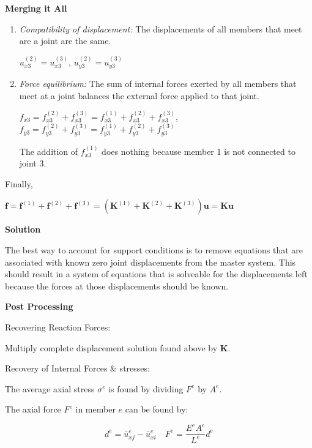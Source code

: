 \documentclass{article}
\begin{document}
\begin{multicols*}{2}
    \textbf{Merging it All}\par 
    \begin{enumerate}
        \item \textit{Compatibility of displacement:} The displacements of all 
                members that meet are a joint are the same.\par
                $u_{x3}^{(2)} = u_{x3}^{(3)}$, $u_{y3}^{(2)} = u_{y3}^{(3)}$
        \item \textit{Force equilibrium:} The sum of internal forces exerted by 
                all members that meet at a joint balances the external force 
                applied to that joint.\par 
                $f_{x3} = f_{x3}^{(2)}+f_{x3}^{(3)}=f_{x3}^{(1)}+f_{x3}^{(2)}+f_{x3}^{(3)}$, 
                $f_{y3} = f_{y3}^{(2)}+f_{y3}^{(3)}=f_{y3}^{(1)}+f_{y3}^{(2)}+f_{y3}^{(3)}$\par
                The addition of $f_{x3}^{(1)}$ does nothing because member 1 is
                not connected to joint 3.
    \end{enumerate}

    Finally, \par 
    $\textbf{f} = \textbf{f}^{(1)}+\textbf{f}^{(2)}+\textbf{f}^{(3)}=\left(\textbf{K}^{(1)}+\textbf{K}^{(2)}+\textbf{K}^{(3)}\right)\textbf{u} = \textbf{Ku}$

    \textbf{Solution}

    The best way to account for support conditions is to remove equations that
    are associated with known zero joint displacements from the master system.
    This should result in a system of equations that is solveable for the displacements
    left because the forces at those displacements should be known.

    \textbf{Post Processing}

    Recovering Reaction Forces:\par 
    Multiply complete displacement solution found above by \textbf{K}.\par 
    Recovery of Internal Forces \& stresses:\par 
    The average axial stress $\sigma^e$ is found by dividing $F^e$ by $A^e$.\par 
    The axial force $F^e$ in member $e$ can be found by:\par 
    \begin{equation*}
        d^e=\bar{u}_{xj}^e-\bar{u}_{xi}^e
        \quad
        F^e=\frac{E^eA^e}{L^e}d^e
    \end{equation*}




\end{multicols*}  
\end{document}
